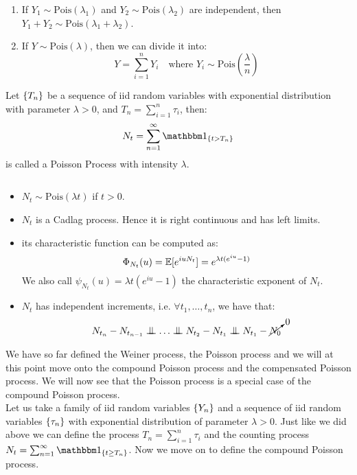 \begin{remark}
    $ $ \newline %
    \begin{enumerate}
        \item If $Y_1 \sim \text{Pois}(\lambda_1)$ and $Y_2 \sim
            \text{Pois}(\lambda_2)$ are independent, then $Y_1 + Y_2 \sim
            \text{Pois}(\lambda_1 + \lambda_2)$.
        \item If $Y \sim \text{Pois}(\lambda)$, then we can divide it into:
            \[ 
                Y = \sum^n_{i=1} Y_i \quad \text{where } Y_i \sim \text{Pois}
                \left( \frac{\lambda}{n} \right)
            \]
    \end{enumerate}
\end{remark}

\begin{definition}
Let $\{ T_n \}$ be a sequence of iid random variables with exponential distribution
with parameter $\lambda > 0$, and $T_n = \sum^n_{i=1} \tau_i$, then:
\[ N_t = \sum^\infty_{n=1} \I_{\{t > T_n\}} \]
is called a Poisson Process with intensity $\lambda$.
\end{definition}

\begin{properties}
    $ $ \newline %
    \begin{itemize}
        \item $N_t\sim\text{Pois}(\lambda t)$ if $t>0$.
        \item $N_t$ is a Cadlag process. Hence it is right continuous and has
            left limits.
        \item its characteristic function can be computed as:
            \[
                \Phi_{N_t}(u) = \mathbb{E}[e^{iuN_t}] = e^{\lambda t(e^{iu}-1)}
            \]
            We also call $\psi_{N_t}(u) = \lambda t(e^{iu}-1)$ the characteristic
            exponent of $N_t$.
        \item $N_t$ has independent increments, i.e. $\forall t_1,\ldots,t_n$,
            we have that:
            \[ N_{t_n} - N_{t_{n-1}} \indep \ldots \indep N_{t_2} - N_{t_1} \indep
                N_{t_1} - \cancelto{0}{N_0}
            \]
    \end{itemize}
\end{properties}

We have so far defined the Weiner process, the Poisson process and we will at
this point move onto the compound Poisson process and the compensated Poisson
process. We will now see that the Poisson process is a special case of the
compound Poisson process. \\
Let us take a family of iid random variables $\{ Y_n \}$ and a sequence of iid
random variables $\{ \tau_n \}$ with exponential distribution of parameter 
$\lambda > 0$. Just like we did above we can define the process $T_n = 
\sum^n_{i=1} \tau_i$ and the counting process $N_t = \sum^\infty_{n=1}
\I_{\{t\geq T_n\}}$. Now we move on to define the compound Poisson process.

